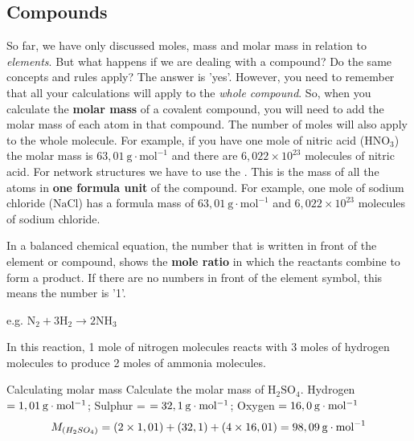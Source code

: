             \subsection*{Compounds}
            \nopagebreak
      \label{m38717*id278284}So far, we have only discussed moles, mass and molar mass in relation to \textsl{elements}. But what happens if we are dealing with a compound? Do the same concepts and rules apply? The answer is 'yes'. However, you need to remember that all your calculations will apply to the \textsl{whole compound}. So, when you calculate the \textbf{molar mass} of a covalent compound, you will need to add the molar mass of each atom in that compound. The number of moles will also apply to the whole molecule. For example, if you have one mole of nitric acid ($\text{HNO}_{3}$) the molar mass is $63,01~\text{g}\cdot{\text{mol}}^{-1}$ and there are $6,022 \times 10^{23}$ molecules of nitric acid. For network structures we have to use the . This is the mass of all the atoms in \textbf{one formula unit} of the compound. For example, one mole of sodium chloride ($\text{NaCl}$) has a formula mass of $63,01~\text{g}\cdot{\text{mol}}^{-1}$ and $6,022 \times 10^{23}$ molecules of sodium chloride. \par 
      \label{m38717*id278429}In a balanced chemical equation, the number that is written in front of the element or compound, shows the \textbf{mole ratio} in which the reactants combine to form a product. If there are no numbers in front of the element symbol, this means the number is '1'.\par 
      \label{m38717*id278442}e.g. ${\text{N}}_{2}+3{\text{H}}_{2}\to 2\text{N}{\text{H}}_{3}$\par 
      \label{m38717*id278488}In this reaction, 1 mole of nitrogen molecules reacts with 3 moles of hydrogen molecules to produce 2 moles of ammonia molecules.\par 
\label{m38717*secfhsst!!!underscore!!!id566}\vspace{-1cm} 
      \begin{wex}{Calculating molar mass }{
      \label{m38717*probfhsst!!!underscore!!!id567}
      \label{m38717*id278505}Calculate the molar mass of $\text{H}{}_{2}\text{SO}{}_{4}$.
      \vspace{5pt}}
{
      \label{m38717*id278575}Hydrogen $=1,01\phantom{\rule{2pt}{0ex}}\text{g}\ensuremath{\cdot}\text{mol}{}^{-1}$; Sulphur = $=32,1\phantom{\rule{2pt}{0ex}}\text{g}\ensuremath{\cdot}\text{mol}{}^{-1}$; Oxygen $=16,0\phantom{\rule{2pt}{0ex}}\text{g}\ensuremath{\cdot}\text{mol}{}^{-1}$ 
      \label{m38717*id278632}\nopagebreak\noindent{}
    \begin{equation*}
    {M}_{\left({H}_{2}S{O}_{4}\right)}=\left(2\ensuremath{\times}1,01\right)+\left(32,1\right)+\left(4\ensuremath{\times}16,01\right)=98,09\phantom{\rule{2pt}{0ex}}\text{g}\ensuremath{\cdot}{\text{mol}}^{-1}
      \end{equation*}
}
    \end{wex}
